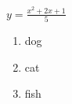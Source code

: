 \documentclass[11pt]{article}
\def\eq1{y=\frac{x^2+2x+1}{5}}
\newcommand{\set}[1]{\setlength\itemsep{#1em}}
\begin{document}
$\eq1$

\begin{enumerate}
\set{2}
\item dog
\item cat
\item fish
\end{enumerate}
\end{document}
